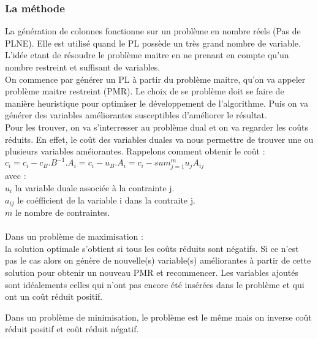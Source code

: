 \subsubsection{La méthode}
La génération de colonnes fonctionne sur un problème en nombre réels (Pas de PLNE). Elle est utilisé quand le PL possède un très grand nombre de variable. L'idée etant de résoudre le problème maitre en ne prenant en compte qu'un nombre restreint et suffisant de variables.\\

On commence par générer un PL à partir du problème maitre, qu'on va appeler problème maitre restreint (PMR). Le choix de se problème doit se faire de manière heuristique pour optimiser le développement de l'algorithme. Puis on va générer des variables améliorantes susceptibles d'améliorer le résultat.\\

Pour les trouver, on va s'interresser au problème dual et on va regarder les coûts réduits. En effet, le coût des variables duales va nous permettre de trouver une ou plusieurs variables améiorantes.
Rappelons comment obtenir le coût :\\
$c_i = c_i - c_B.B^{-1}.A_i = c_i - u_B.A_i = c_i - sum_{j=1}^{m}{u_j A_{ij}}$\\

avec :\\
$u_i$ la variable duale associée à la contrainte j.\\
$a_{ij}$ le coéfficient de la variable i dans la contraite j.\\
$m$ le nombre de contraintes.\\
\\
Dans un problème de maximisation :\\
la solution optimale s'obtient si tous les coûts réduits sont négatifs. Si ce n'est pas le cas alors on génère de nouvelle(s) variable(s) améliorantes à partir de cette solution pour obtenir un nouveau PMR et recommencer. Les variables ajoutés sont idéalements celles qui n'ont pas encore été insérées dans le problème et qui ont un coût réduit positif.

Dans un problème de minimisation, le problème est le même mais on inverse coût réduit positif et coût réduit négatif.
